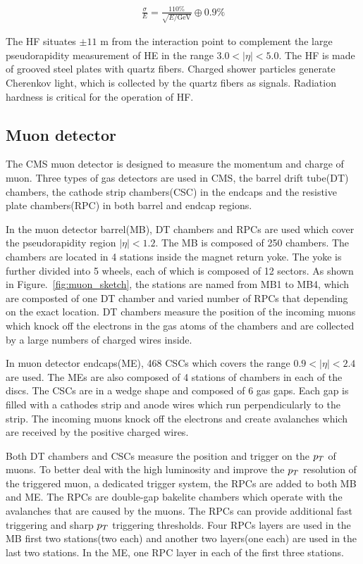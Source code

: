 \begin{align*}
\frac{\sigma}{E}=\frac{110\%}{\sqrt{E/\textrm{GeV}}}\oplus 0.9\%
\end{align*}

The HF situates $\pm11$ m from the interaction point to complement the large pseudorapidity measurement of HE in the range $3.0<|\eta|<5.0$. The HF is made of grooved steel plates with quartz fibers. Charged shower particles generate Cherenkov light, which is collected by the quartz fibers as signals. Radiation hardness is critical for the operation of HF.   



\subsection{Muon detector}
The CMS muon detector is designed to measure the momentum and charge of muon. Three types of gas detectors are used in CMS, the barrel drift tube(DT) chambers, the cathode strip chambers(CSC) in the endcaps and the resistive plate chambers(RPC) in both barrel and endcap regions. 

In the muon detector barrel(MB), DT chambers and RPCs are used which cover the pseudorapidity region $|\eta|<1.2$. The MB is composed of 250 chambers. The chambers are located in 4 stations inside the magnet return yoke. The yoke is further divided into 5 wheels, each of which is composed of 12 sectors. As shown in Figure.~\ref{fig:muon_sketch}, the stations are named from MB1 to MB4, which are composted of one DT chamber and varied number of RPCs that depending on the exact location. DT chambers measure the position of the incoming muons which knock off the electrons in the gas atoms of the chambers and are collected by a large numbers of charged wires inside.%

In muon detector endcaps(ME), 468 CSCs which covers the range $0.9<|\eta|<2.4$ are used. The MEs are also composed of 4 stations of chambers in each of the discs. The CSCs are in a wedge shape and composed of 6 gas gaps. Each gap is filled with a cathodes strip and anode wires which run perpendicularly to the strip. The incoming muons knock off the electrons and create avalanches which are received by the positive charged wires. 

Both DT chambers and CSCs measure the position and trigger on the $p_{T}$ of muons. To better deal with the high luminosity and improve the $p_{T}$ resolution of the triggered muon, a dedicated trigger system, the RPCs are added to both MB and ME. The RPCs are double-gap bakelite chambers which operate with the avalanches that are caused by the muons. The RPCs can provide additional fast triggering and sharp $p_{T}$ triggering thresholds. Four RPCs layers are used in the MB first two stations(two each) and another two layers(one each) are used in the last two stations.  In the ME, one RPC layer in each of the first three stations.    



